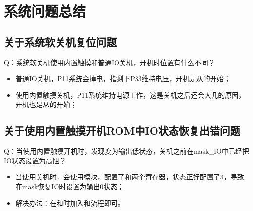 \section{系统问题总结}
\subsection{关于系统软关机复位问题}
Q：系统软关机使用内置触摸和普通IO关机，开机时位置有什么不同？
\begin{itemize}
    \item 普通IO关机，P11系统会掉电，指剩下P33维持电压，开机是从的开始；
    \item 使用内置触摸关机，P11系统维持电源工作，这是关机之后还会大几的原因，开机也是从的开始；
\end{itemize}

\subsection{关于使用内置触摸开机ROM中IO状态恢复出错问题}
Q：当使用内置触摸开机时，发现变为输出低状态，关机之前在mask\_IO中已经把IO状态设置为高阻？
\begin{itemize}
    \item 当使用关机时，会使用模块，配置了和两个寄存器，状态正好配置了3，导致在mask恢复IO时设置为输出0状态；
    \item 解决办法：在和时加入和流程即可。
\end{itemize}
